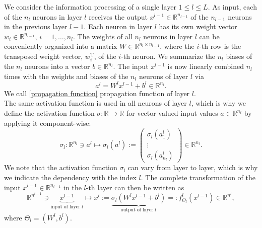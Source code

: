 We consider the information processing of a single layer $1 \leq l \leq L$. As input, each of the $n_l$ neurons in layer $l$ receives the output $x^{l-1} \in \mathbb{R}^{n_{l-1}}$ of the $n_{l-1}$ neurons in the previous layer $l-1$. Each neuron in layer $l$ has its own weight vector $w_i \in \mathbb{R}^{n_{l-1}}$, $i = 1, \ldots, n_l$. The weights of all $n_l$ neurons in layer $l$ can be conveniently organized into a matrix $W \in \mathbb{R}^{n_l \times n_{l-1}}$, where the $i$-th row is the transposed weight vector, $w^{\mathrm{T}}_i$, of the $i$-th neuron. We summarize the $n_l$ biases of the $n_l$ neurons into a vector $b \in \mathbb{R}^{n_l}$. The input $x^{l-1}$ is now linearly combined $n_l$ times with the weights and biases of the $n_l$ neurons of layer $l$ via 
\begin{equation}
    \label{propagation function}
    a^l = W^l x^{l-1} + b^l \in \mathbb{R}^{n_l}.
\end{equation}
We call \cref{propagation function} propagation function of layer $l$. \\
The same activation function is used in all neurons of layer $l$, which is why we define the activation function $\sigma \colon \mathbb{R} \to \mathbb{R}$ for vector-valued input values $a \in \mathbb{R}^{n_l}$ by applying it component-wise:
\begin{equation*}
    \sigma_l \colon \mathbb{R}^{n_l} \ni a^l \mapsto \sigma_l (a^l):= \left(
        \begin{array}
            {c} \sigma_l \left( a^l_{1} \right) \\
            \vdots \\
            \sigma_l \left( a^l_{n_l} \right)
        \end{array}
        \right) \in \mathbb{R}^{n_l}.
\end{equation*}
We note that the activation function $\sigma_l$ can vary from layer to layer, which is why we indicate the dependency with the index $l$. The complete transformation of the input $x^{l-1} \in \mathbb{R}^{n_{l-1}}$ in the $l$-th layer can then be written as
\begin{equation}
    \label{action layer}
    \mathbb{R}^{n^{l-1}} \ni \underbrace{x^{l-1}}_{\text{input of layer } l} \mapsto x^{l}:=\underbrace{\sigma_{l}\left( W^{l} x^{l-1} + b^{l} \right)}_{\text{output of layer } l}=: f^{l}_{\Theta_l} \left( x^{l-1} \right) \in \mathbb{R}^{n^{l}}, 
\end{equation}
where $\Theta_l = (W^{l}, b^{l})$. \\


